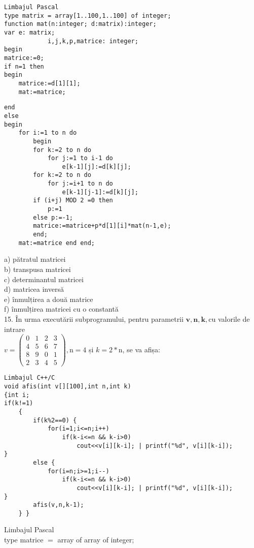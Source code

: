 \begin{verbatim}
Limbajul Pascal
type matrix = array[1..100,1..100] of integer;
function mat(n:integer; d:matrix):integer;
var e: matrix;
            i,j,k,p,matrice: integer;
begin
matrice:=0;
if n=1 then
begin
    matrice:=d[1][1];
    mat:=matrice;
\end{verbatim}

\begin{verbatim}
end
else
begin
    for i:=1 to n do
        begin
        for k:=2 to n do
            for j:=1 to i-1 do
                e[k-1][j]:=d[k][j];
        for k:=2 to n do
            for j:=i+1 to n do
                e[k-1][j-1]:=d[k][j];
        if (i+j) MOD 2 =0 then
            p:=1
        else p:=-1;
        matrice:=matrice+p*d[1][i]*mat(n-1,e);
        end;
    mat:=matrice end end;
\end{verbatim}

a) pătratul matricei\\
b) transpusa matricei\\
c) determinantul matricei\\
d) matricea inversă\\
e) înmulțirea a două matrice\\
f) înmulțirea matricei cu o constantă\\
15. În urma executării subprogramului, pentru parametrii $\mathbf{v}, \mathbf{n}, \mathbf{k}, \mathrm{cu}$ valorile de intrare\\
$v=\left(\begin{array}{llll}0 & 1 & 2 & 3 \\ 4 & 5 & 6 & 7 \\ 8 & 9 & 0 & 1 \\ 2 & 3 & 4 & 5\end{array}\right), \mathrm{n}=4$ și $k=2 * \mathrm{n}$, se va afișa:

\begin{verbatim}
Limbajul C++/C
void afis(int v[][100],int n,int k)
{int i;
if(k!=1)
    {
        if(k%2==0) {
            for(i=1;i<=n;i++)
                if(k-i<=n && k-i>0)
                    cout<<v[i][k-i]; | printf("%d", v[i][k-i]);
}
        else {
            for(i=n;i>=1;i--)
                if(k-i<=n && k-i>0)
                    cout<<v[i][k-i]; | printf("%d", v[i][k-i]);
}
        afis(v,n,k-1);
    } }
\end{verbatim}

Limbajul Pascal\\
type matrice $=$ array of array of integer;


